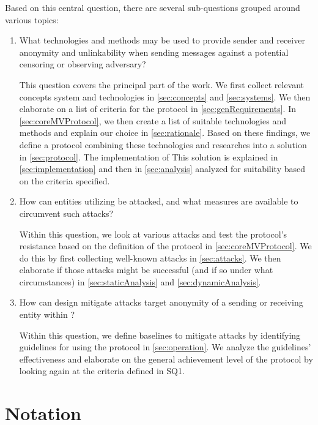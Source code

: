 Based on this central question, there are several sub-questions grouped around various topics:

\begin{enumerate}
	\item What technologies and methods may be used to provide sender and receiver anonymity and unlinkability when sending messages against a potential censoring or observing adversary? 
	
	This question covers the principal part of the work. We first collect relevant concepts system and technologies in \cref{sec:concepts} and \ref{sec:systems}. We then elaborate on a list of criteria for the \MessageVortex{} protocol in \cref{sec:genRequirements}. In \cref{sec:coreMVProtocol}, we then create a list of suitable technologies and methods and explain our choice in \cref{sec:rationale}. Based on these findings, we define a protocol combining these technologies and researches into a solution in \cref{sec:protocol}. The implementation of This solution is explained in \cref{sec:implementation} and then in \cref{sec:analysis} analyzed for suitability based on the criteria specified. 
	
	\item How can entities utilizing \MessageVortex{} be attacked, and what measures are available to circumvent such attacks? 
	
	Within this question, we look at various attacks and test the protocol's resistance based on the definition of the protocol in \cref{sec:coreMVProtocol}. We do this by first collecting well-known attacks in \cref{sec:attacks}. We then elaborate if those attacks might be successful (and if so under what circumstances) in \cref{sec:staticAnalysis} and \cref{sec:dynamicAnalysis}.
	
	\item How can design mitigate attacks target anonymity of a sending or receiving entity within \MessageVortex? 
	
	Within this question, we define baselines to mitigate attacks by identifying guidelines for using the protocol in \cref{sec:operation}. We analyze the guidelines' effectiveness and elaborate on the general achievement level of the protocol by looking again at the criteria defined in SQ1. 
	
\end{enumerate}

\chapter{Notation}

